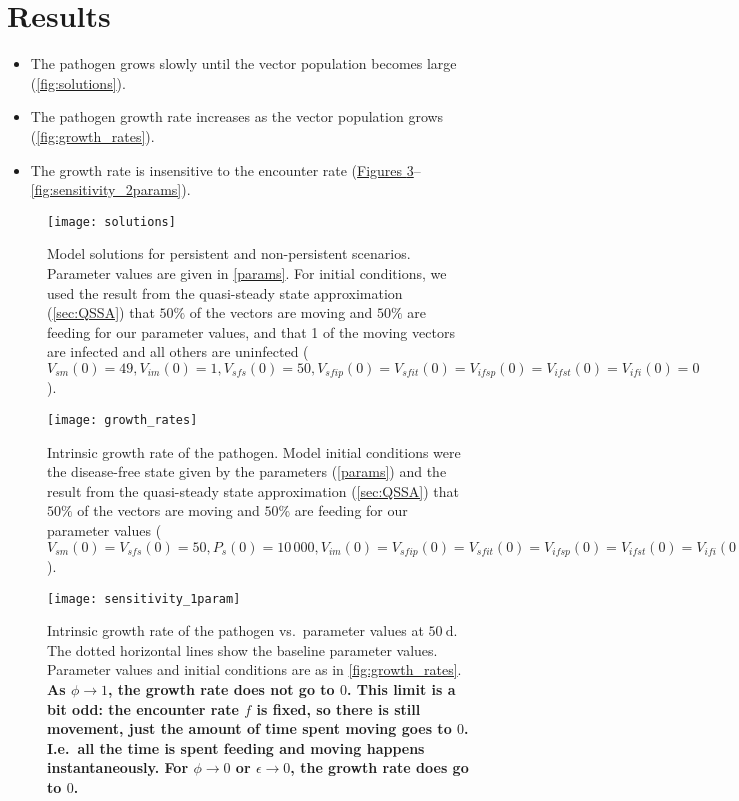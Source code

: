 \documentclass{article}
\newcommand{\comment}[1]{\textbf{#1}}
\begin{document}
\section{Results}

\begin{itemize}
\item The pathogen grows slowly until the vector population becomes
  large (\autoref{fig:solutions}).

\item The pathogen growth rate increases as the vector population
  grows (\autoref{fig:growth_rates}).

\item The growth rate is insensitive to the encounter rate
  (\hyperref[fig:sensitivity_1param]{Figures
    \ref*{fig:sensitivity_1param}}--\ref{fig:sensitivity_2params}).
\end{itemize}


\begin{figure}
  \centering
  \texttt{[image: solutions]}
  \caption{Model solutions for persistent and non-persistent
    scenarios.  Parameter values are given in \autoref{params}.
    For initial conditions, we used the result from the quasi-steady
    state approximation (\autoref{sec:QSSA}) that $50\%$ of the
    vectors are moving and $50\%$ are feeding for our parameter
    values, and that 1 of the moving vectors are infected and all
    others are uninfected ($V_{sm}(0) = 49, V_{im}(0) = 1, V_{sfs}(0) =
    50, V_{sfip}(0) = V_{sfit}(0) = V_{ifsp}(0) = V_{ifst}(0) =
    V_{ifi}(0) = 0$).}
  \label{fig:solutions}
\end{figure}

\begin{figure}
  \centering
  \texttt{[image: growth\_rates]}
  \caption{Intrinsic growth rate of the pathogen.  Model initial
    conditions were the disease-free state given by the parameters
    (\autoref{params}) and the result from the quasi-steady state
    approximation (\autoref{sec:QSSA}) that $50\%$ of the vectors are
    moving and $50\%$ are feeding for our parameter values ($V_{sm}(0)
    = V_{sfs}(0) = 50, P_s(0) = 10\,000, V_{im}(0) = V_{sfip}(0) =
    V_{sfit}(0) = V_{ifsp}(0) = V_{ifst}(0) = V_{ifi}(0) = P_i(0) =
    0$).}
  \label{fig:growth_rates}
\end{figure}

\begin{figure}
  \centering
  \texttt{[image: sensitivity\_1param]}
  \caption{Intrinsic growth rate of the pathogen vs.~parameter values
    at $50~\text{d}$.  The dotted horizontal lines show the baseline
    parameter values.  Parameter values and initial conditions are as
    in \autoref{fig:growth_rates}.
    \comment{As $\phi \to 1$, the
      growth rate does not go to $0$.  This limit is a bit odd: the
      encounter rate $f$ is fixed, so there is still movement, just
      the amount of time spent moving goes to $0$.  I.e.~all the time
      is spent feeding and moving happens instantaneously.  For
      $\phi \to 0$ or $\epsilon \to 0$, the growth rate does go to
      $0$.}}
  \label{fig:sensitivity_1param}
\end{figure}
\end{document}
